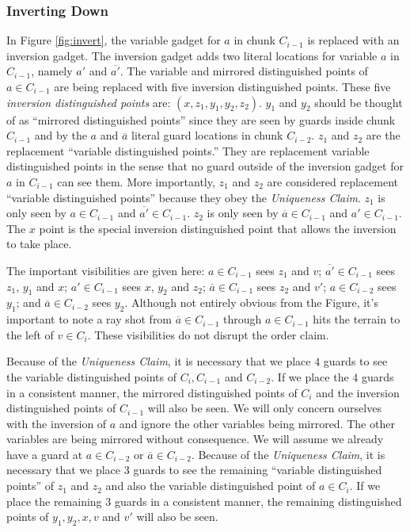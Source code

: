 \documentclass[11pt]{article}
\begin{document}
\subsubsection{Inverting Down}

In Figure \ref{fig:invert}, the variable gadget for $a$ in chunk $C_{i-1}$ is replaced with an inversion gadget.  The inversion gadget adds two literal locations for variable $a$ in $C_{i-1}$, namely $a'$ and $\overline{a'}$.  The variable and mirrored distinguished points of $a \in C_{i-1}$ are being replaced with five inversion distinguished points.  These five \textit{inversion distinguished points} are: $(x, z_1, y_1, y_2, z_2)$.  $y_1$ and $y_2$ should be thought of as ``mirrored distinguished points'' since they are seen by guards inside chunk $C_{i-1}$ and by the $a$ and $\overline{a}$ literal guard locations in chunk $C_{i-2}$.  $z_1$ and $z_2$ are the replacement ``variable distinguished points.''  They are replacement variable distinguished points in the sense that no guard outside of the inversion gadget for $a$ in $C_{i-1}$ can see them.  More importantly, $z_1$ and $z_2$ are considered replacement ``variable distinguished points'' because they obey the {\em Uniqueness Claim}.  $z_1$ is only seen by $a \in C_{i-1}$ and $\overline{a'} \in C_{i-1}$.  $z_2$ is only seen by $\overline{a} \in C_{i-1}$ and $a' \in C_{i-1}$.  The $x$ point is the special inversion distinguished point that allows the inversion to take place.  

The important visibilities are given here: $a \in C_{i-1}$ sees $z_1$ and $v$; $\overline{a'} \in C_{i-1}$ sees $z_1$, $y_1$ and $x$;  $a' \in C_{i-1}$ sees $x$, $y_2$ and $z_2$; $\overline{a} \in C_{i-1}$ sees $z_2$ and $v'$; $a \in C_{i-2}$ sees $y_1$; and $\overline{a} \in C_{i-2}$ sees $y_2$.  Although not entirely obvious from the Figure, it's important to note a ray shot from $\overline{a} \in C_{i-1}$ through $a \in C_{i-1}$ hits the terrain to the left of $v \in C_i$.  These visibilities do not disrupt the order claim.

Because of the {\em Uniqueness Claim}, it is necessary that we place $4$ guards to see the variable distinguished points of $C_i, C_{i-1}$ and $C_{i-2}$.  If we place the $4$ guards in a consistent manner, the mirrored distinguished points of $C_i$ and the inversion distinguished points of $C_{i-1}$ will also be seen.  We will only concern ourselves with the inversion of $a$ and ignore the other variables being mirrored.  The other variables are being mirrored without consequence.  We will assume we already have a guard at $a \in C_{i-2}$ or $\overline{a} \in C_{i-2}$.  Because of the {\em Uniqueness Claim}, it is necessary that we place $3$ guards to see the remaining ``variable distinguished points'' of $z_1$ and $z_2$ and also the variable distinguished point of $a \in C_i$.  If we place the remaining $3$ guards in a consistent manner, the remaining distinguished points of $y_1, y_2, x, v$ and $v'$ will also be seen.  
\end{document}
